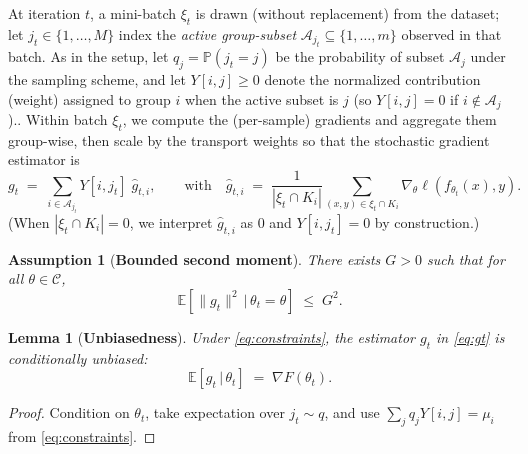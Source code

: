 \documentclass[9pt]{extarticle}
\newtheorem{lemma}{Lemma}
\newtheorem{assumption}{Assumption}
\theoremstyle{definition}
\renewcommand{\paragraph}[1]{\par\medskip\noindent{\bf #1}\hspace{0.5em}\ignorespaces}
\begin{document}
\paragraph{Sampling and weighting.}
At iteration $t$, a mini-batch $\xi_t$ is drawn (without replacement) from the dataset; let $j_t\in\{1,\dots,M\}$ index the \emph{active group-subset} $\mathcal{A}_{j_t}\subseteq\{1,\dots,m\}$ observed in that batch. As in the setup, let $q_j=\mathbb{P}(j_t=j)$ be the probability of subset $\mathcal{A}_j$ under the sampling scheme, and let $Y[i,j]\ge 0$ denote the normalized contribution (weight) assigned to group $i$ when the active subset is $j$ (so $Y[i,j]=0$ if $i\notin\mathcal{A}_j$)..
Within batch $\xi_t$, we compute the (per-sample) gradients and aggregate them group-wise, then scale by the transport weights so that the stochastic gradient estimator is
\begin{equation}\label{eq:gt}
g_t \;=\; \sum_{i\in\mathcal{A}_{j_t}} Y[i,j_t]\;\widehat{g}_{t,i},
\qquad
\text{with}\quad
\widehat{g}_{t,i} \;=\; \frac{1}{|\xi_t\cap K_i|}\sum_{(x,y)\in \xi_t\cap K_i} \nabla_\theta \ell\!\left(f_{\theta_t}(x),y\right).
\end{equation}
(When $|\xi_t\cap K_i|=0$, we interpret $\widehat{g}_{t,i}$ as $0$ and $Y[i,j_t]=0$ by construction.)
\begin{assumption}[\textbf{Bounded second moment}]\label{assump:gradient_bound}
There exists $G>0$ such that for all $\theta\in\mathcal{C}$,
\[
\mathbb{E}\!\left[\|g_t\|^2 \,\big|\, \theta_t=\theta\right] \;\le\; G^2.
\]
\end{assumption}
\begin{lemma}[\textbf{Unbiasedness}]\label{lem:unbiased}
Under \eqref{eq:constraints}, the estimator $g_t$ in \eqref{eq:gt} is conditionally unbiased:
\[
\mathbb{E}\!\left[g_t \,\big|\, \theta_t\right] \;=\; \nabla F(\theta_t).
\]
\end{lemma}
\begin{proof}
Condition on $\theta_t$, take expectation over $j_t\sim q$, and use $\sum_j q_j Y[i,j]=\mu_i$ from \eqref{eq:constraints}.
\end{proof}
\end{document}
